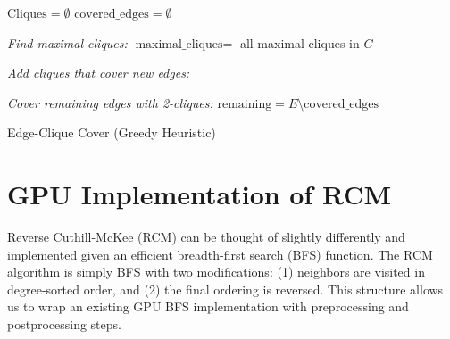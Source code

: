 \begin{algorithm}[H]

    \BlankLine

    $\text{Cliques} = \emptyset$\;
    $\text{covered\_edges} = \emptyset$\;
    \BlankLine

    \emph{Find maximal cliques:}\;
    $\text{maximal\_cliques} = $ all maximal cliques in $G$\;
    \BlankLine

    \emph{Add cliques that cover new edges:}\;
    \BlankLine

    \emph{Cover remaining edges with 2-cliques:}\;
    $\text{remaining} = E \setminus \text{covered\_edges}$\;

    \;

    \caption{Edge-Clique Cover (Greedy Heuristic)}
    \label{alg:edge_clique_cover}
\end{algorithm}

\section{GPU Implementation of RCM}
\label{sec:gpu_rcm}

Reverse Cuthill-McKee (RCM) can be thought of slightly differently and implemented given an efficient breadth-first search (BFS) function. The RCM algorithm is simply BFS with two modifications: (1) neighbors are visited in degree-sorted order, and (2) the final ordering is reversed. This structure allows us to wrap an existing GPU BFS implementation with preprocessing and postprocessing steps.

